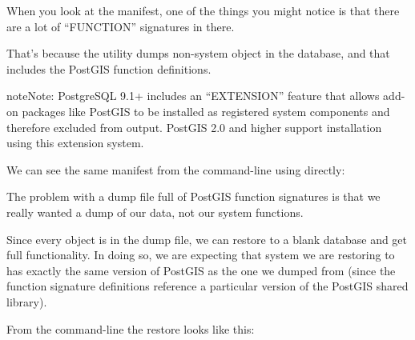 \documentclass[a4paper,11pt,english]{sphinxmanual}
\begin{document}
\noindent{}

When you look at the manifest, one of the things you might notice is that there are a lot of “FUNCTION” signatures in there.

\noindent{}

That’s because the  utility dumps  non-system object in the database, and that includes the PostGIS function definitions.

\begin{sphinxadmonition}{note}{Note:}
PostgreSQL 9.1+ includes an “EXTENSION” feature that allows add-on packages like PostGIS to be installed as registered system components and therefore excluded from  output. PostGIS 2.0 and higher support installation using this extension system.
\end{sphinxadmonition}

We can see the same manifest from the command-line using  directly:

\begin{sphinxVerbatim}[commandchars=\\\{\}]
  
\end{sphinxVerbatim}

The problem with a dump file full of PostGIS function signatures is that we really wanted a dump of our data, not our system functions.

Since every object is in the dump file, we can restore to a blank database and get full functionality. In doing so, we are expecting that system we are restoring to has exactly the same version of PostGIS as the one we dumped from (since the function signature definitions reference a particular version of the PostGIS shared library).

From the command-line the restore looks like this:

\begin{sphinxVerbatim}[commandchars=\\\{\}]
   
     
\end{sphinxVerbatim}
\end{document}
